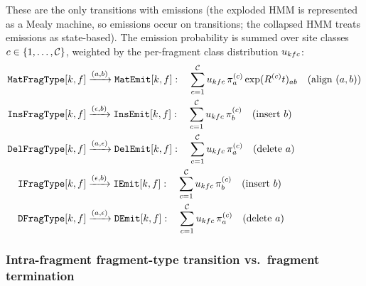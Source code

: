 These are the only transitions with emissions (the exploded HMM is represented as a Mealy machine, so emissions occur on transitions; the collapsed HMM treats emissions as state-based).
The emission probability is summed over site classes $c \in \{1,\ldots,\mathcal{C}\}$,
weighted by the per-fragment class distribution $u_{kfc}$:
\begin{align}
\mathtt{MatFragType}[k,f] &\xrightarrow{(a,b)} \mathtt{MatEmit}[k,f]: \quad \sum_{c=1}^{\mathcal{C}} u_{kfc}\, \pi^{(c)}_a \exp(R^{(c)} t)_{ab}
  \quad\text{(align $(a,b)$)} \\
\mathtt{InsFragType}[k,f] &\xrightarrow{(\epsilon,b)} \mathtt{InsEmit}[k,f]: \quad \sum_{c=1}^{\mathcal{C}} u_{kfc}\, \pi^{(c)}_b
  \quad\text{(insert $b$)} \\
\mathtt{DelFragType}[k,f] &\xrightarrow{(a,\epsilon)} \mathtt{DelEmit}[k,f]: \quad \sum_{c=1}^{\mathcal{C}} u_{kfc}\, \pi^{(c)}_a
  \quad\text{(delete $a$)} \\
\mathtt{IFragType}[k,f] &\xrightarrow{(\epsilon,b)} \mathtt{IEmit}[k,f]: \quad \sum_{c=1}^{\mathcal{C}} u_{kfc}\, \pi^{(c)}_b
  \quad\text{(insert $b$)} \\
\mathtt{DFragType}[k,f] &\xrightarrow{(a,\epsilon)} \mathtt{DEmit}[k,f]: \quad \sum_{c=1}^{\mathcal{C}} u_{kfc}\, \pi^{(c)}_a
  \quad\text{(delete $a$)}
\end{align}

\subsubsection{Intra-fragment fragment-type transition vs.\ fragment termination}
\label{sec:mixdom-frag-trans}

